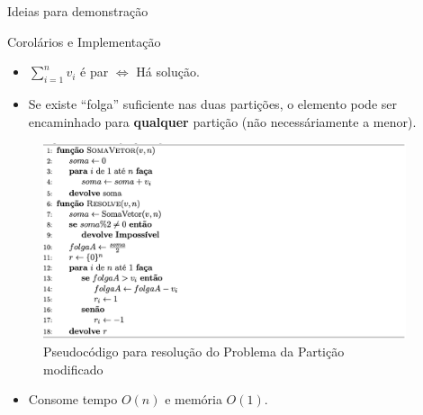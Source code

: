 \documentclass[final,hyperref={pdfpagelabels=false}]{beamer}
\begin{document}
\begin{frame}[t]
\begin{columns}[t]
\begin{column}{.465\textwidth}
\begin{block}{Ideias para demonstração}
\begin{itemize}
\end{itemize}

\end{block}


\begin{block}{Corolários e Implementação}

\begin{itemize}

\item $\sum_{i = 1}^n v_i$ é par $\Leftrightarrow$ Há solução.
\item Se existe ``folga'' suficiente nas duas partições, o elemento pode ser encaminhado para \textbf{qualquer} partição (não necessáriamente a menor).
\end{itemize}

\begin{figure}
\includegraphics[width=0.8\linewidth]{pseudo.png}
\caption{Pseudocódigo para resolução do Problema da Partição modificado}
\end{figure}

\begin{itemize}
\item Consome tempo $O(n)$ e memória $O(1)$.
\end{itemize}

\end{block}



\end{column} %

\begin{column}{.03\textwidth}\end{column} %
 

\end{columns}
\end{frame}
\end{document}

